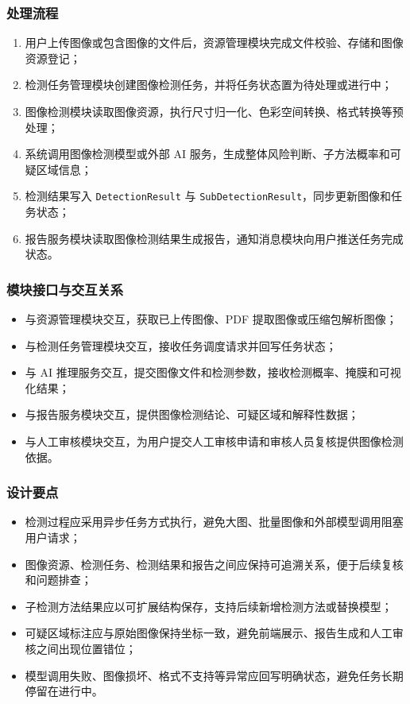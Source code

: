 \subsubsection{处理流程}
\begin{enumerate}[leftmargin=2em]
    \item 用户上传图像或包含图像的文件后，资源管理模块完成文件校验、存储和图像资源登记；
    \item 检测任务管理模块创建图像检测任务，并将任务状态置为待处理或进行中；
    \item 图像检测模块读取图像资源，执行尺寸归一化、色彩空间转换、格式转换等预处理；
    \item 系统调用图像检测模型或外部 AI 服务，生成整体风险判断、子方法概率和可疑区域信息；
    \item 检测结果写入 \texttt{DetectionResult} 与 \texttt{SubDetectionResult}，同步更新图像和任务状态；
    \item 报告服务模块读取图像检测结果生成报告，通知消息模块向用户推送任务完成状态。
\end{enumerate}

\subsubsection{模块接口与交互关系}
\begin{itemize}[leftmargin=2em]
    \item 与资源管理模块交互，获取已上传图像、PDF 提取图像或压缩包解析图像；
    \item 与检测任务管理模块交互，接收任务调度请求并回写任务状态；
    \item 与 AI 推理服务交互，提交图像文件和检测参数，接收检测概率、掩膜和可视化结果；
    \item 与报告服务模块交互，提供图像检测结论、可疑区域和解释性数据；
    \item 与人工审核模块交互，为用户提交人工审核申请和审核人员复核提供图像检测依据。
\end{itemize}

\subsubsection{设计要点}
\begin{itemize}[leftmargin=2em]
    \item 检测过程应采用异步任务方式执行，避免大图、批量图像和外部模型调用阻塞用户请求；
    \item 图像资源、检测任务、检测结果和报告之间应保持可追溯关系，便于后续复核和问题排查；
    \item 子检测方法结果应以可扩展结构保存，支持后续新增检测方法或替换模型；
    \item 可疑区域标注应与原始图像保持坐标一致，避免前端展示、报告生成和人工审核之间出现位置错位；
    \item 模型调用失败、图像损坏、格式不支持等异常应回写明确状态，避免任务长期停留在进行中。
\end{itemize}

